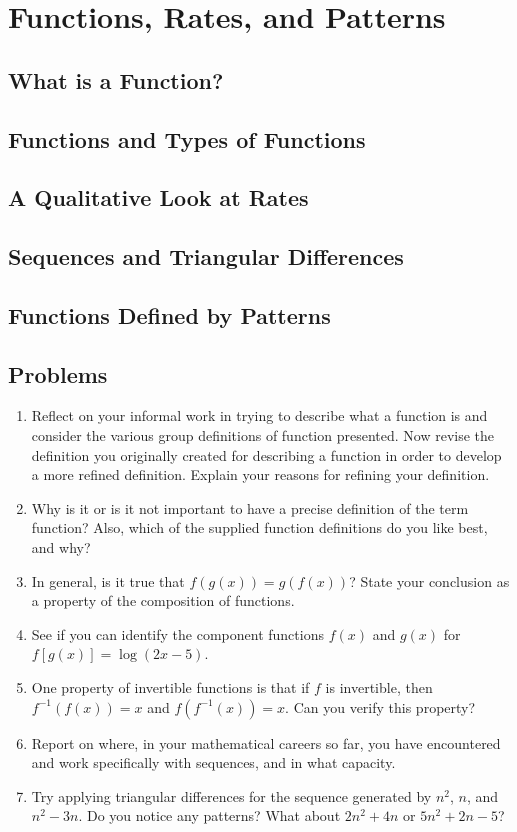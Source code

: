\documentclass[../precalc.tex]{subfiles}
\begin{document}
\chapter{Functions, Rates, and Patterns}
\section{What is a Function?}
\section{Functions and Types of Functions}
\section{A Qualitative Look at Rates}
\section{Sequences and Triangular Differences}
\section{Functions Defined by Patterns}

\section*{Problems}
\begin{enumerate}
    \item Reflect on your informal work in trying to describe what a function is and consider the various group definitions of function presented. Now revise the definition you originally created for describing a function in order to develop a more refined definition. Explain your reasons for refining your definition.
    \item Why is it or is it not important to have a precise definition of the term function? Also, which of the supplied function definitions do you like best, and why?
    \item In general, is it true that $f(g(x))=g(f(x))$? State your conclusion as a property of the composition of functions.
    \item See if you can identify the component functions $f(x)$ and $g(x)$ for $f[g(x)]=\log(2x-5)$.
    \item One property of invertible functions is that if $f$ is invertible, then $f^{-1}(f(x))=x$ and $f(f^{-1}(x))=x$. Can you verify this property?
    \item Report on where, in your mathematical careers so far, you have encountered and work specifically with sequences, and in what capacity.
    \item Try applying triangular differences for the sequence generated by $n^2$, $n$, and $n^2-3n$. Do you notice any patterns? What about $2n^2+4n$ or $5n^2+2n-5$? 
\end{enumerate}
\end{document}
